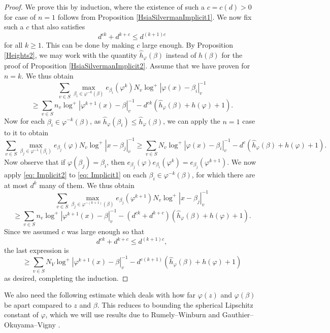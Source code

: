 \documentclass[10pt, reqno]{amsart}
\newcommand{\vphi}{\varphi}
\newcommand{\h}{\widehat{h}}
\numberwithin{theorem}{section}
\numberwithin{equation}{section}
\numberwithin{example}{section}
\numberwithin{definition}{section}
\begin{document}
\begin{proof}
We prove this by induction, where the existence of such a $c = c(d) > 0$ for case of $n = 1$ follows from Proposition \ref{HsiaSilvermanImplicit1}. We now fix such a $c$ that also satisfies 
$$d^{ck} + d^{k+c} \leq d^{(k+1)c}$$
for all $k \geq 1$. This can be done by making $c$ large enough. 
By Proposition \ref{Heights2}, we may work with the quantity $\h_{\vphi}(\beta)$ instead of $h(\beta)$ for the proof of Proposition \ref{HsiaSilvermanImplicit2}. Assume that we have proven for $n = k$. We thus obtain 
\begin{equation} \label{eq: Implicit1}
\sum_{v \in S} \max_{\beta_i \in \vphi^{-k}(\beta)} e_{\beta_i}(\vphi^k) N_v \log^+|\vphi(x) - \beta_i|_v^{-1}
\end{equation}
$$
\geq \sum_{v \in S} n_v \log^+|\vphi^{k+1}(x) - \beta|_v^{-1} - d^{ck}(\h_{\vphi}(\beta) + h(\vphi)+1).
$$
Now for each $\beta_i \in \vphi^{-k}(\beta)$, as $\h_{\vphi}(\beta_i) \leq \h_{\vphi}(\beta)$, we  can apply the $n = 1$ case to it to obtain 
\begin{equation} \label{eq: Implicit2}
\sum_{v \in S} \max_{\beta_j \in \vphi^{-1}(\beta_i)} e_{\beta_j}(\vphi) N_v \log^+|x - \beta_j|_v^{-1} \geq \sum_{v \in S} N_v \log^+|\vphi(x) - \beta_i|_v^{-1} - d^c (\h_{\vphi}(\beta) + h(\vphi)+1).
\end{equation}
Now observe that if $\vphi(\beta_j) = \beta_i$, then $e_{\beta_j}(\vphi) e_{\beta_i}(\vphi^k) = e_{\beta_j}(\vphi^{k+1})$. We now apply \eqref{eq: Implicit2} to \eqref{eq: Implicit1} on each $\beta_i \in \vphi^{-k}(\beta)$, for which there are at most $d^k$ many of them. We thus obtain 
$$\sum_{v \in S} \max_{\beta_j \in \vphi^{-(k+1)}(\beta)} e_{\beta_j}(\vphi^{k+1}) N_v \log^+|x-\beta_j|^{-1}_v $$
$$\geq \sum_{v \in S} n_v \log^+|\vphi^{k+1}(x) - \beta|_v^{-1} - (d^{ck} + d^{k+c})(\h_{\vphi}(\beta) + h(\vphi)+1).$$
Since we assumed $c$ was large enough so that 
$$d^{ck} + d^{k+c} \leq d^{(k+1)c},$$
the last expression is 
$$\geq \sum_{v \in S} N_V \log^+|\vphi^{k+1}(x) - \beta|_v^{-1} - d^{c(k+1)} (\h_{\vphi}(\beta) + h(\vphi)+1)$$
as desired, completing the induction. 
\end{proof}

We also need the following estimate which deals with how far $\vphi(z)$ and $\vphi(\beta)$ be apart compared to $z$ and $\beta$. This reduces to bounding the spherical Lipschitz constant of $\vphi$, which we will use results due to Rumely--Winburn \cite{RL15} and Gauthier--Okuyama--Vigny \cite{GOV20}. 
\end{document}
